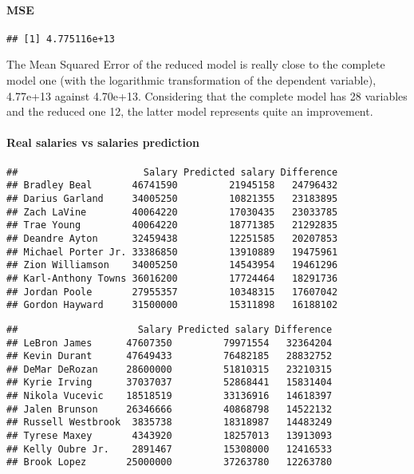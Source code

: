 \documentclass[
]{article}
\begin{document}
\hypertarget{mse}{%
\paragraph{MSE}\label{mse}}

\begin{verbatim}
## [1] 4.775116e+13
\end{verbatim}

The Mean Squared Error of the reduced model is really close to the
complete model one (with the logarithmic transformation of the dependent
variable), 4.77e+13 against 4.70e+13. Considering that the complete
model has 28 variables and the reduced one 12, the latter model
represents quite an improvement.

\hypertarget{real-salaries-vs-salaries-prediction}{%
\paragraph{Real salaries vs salaries
prediction}\label{real-salaries-vs-salaries-prediction}}

\begin{verbatim}
##                      Salary Predicted salary Difference
## Bradley Beal       46741590         21945158   24796432
## Darius Garland     34005250         10821355   23183895
## Zach LaVine        40064220         17030435   23033785
## Trae Young         40064220         18771385   21292835
## Deandre Ayton      32459438         12251585   20207853
## Michael Porter Jr. 33386850         13910889   19475961
## Zion Williamson    34005250         14543954   19461296
## Karl-Anthony Towns 36016200         17724464   18291736
## Jordan Poole       27955357         10348315   17607042
## Gordon Hayward     31500000         15311898   16188102
\end{verbatim}

\begin{verbatim}
##                     Salary Predicted salary Difference
## LeBron James      47607350         79971554   32364204
## Kevin Durant      47649433         76482185   28832752
## DeMar DeRozan     28600000         51810315   23210315
## Kyrie Irving      37037037         52868441   15831404
## Nikola Vucevic    18518519         33136916   14618397
## Jalen Brunson     26346666         40868798   14522132
## Russell Westbrook  3835738         18318987   14483249
## Tyrese Maxey       4343920         18257013   13913093
## Kelly Oubre Jr.    2891467         15308000   12416533
## Brook Lopez       25000000         37263780   12263780
\end{verbatim}
\end{document}
